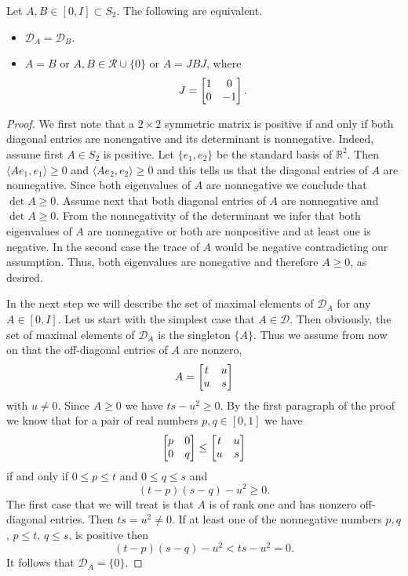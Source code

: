 \documentclass[10pt,a4paper]{amsart}
\begin{document}
\begin{lemma}\label{max}
Let $A,B \in [0,I] \subset S_2$. The following are equivalent.
\begin{itemize}
\item $\mathcal{D}_A = \mathcal{D}_B$.
\item $A= B$ or $A,B \in \mathcal{R} \cup \{ 0 \}$ or $A = JBJ$,
where
$$
J = \left[ \begin{matrix} 1& 0 \cr 0 & -1 \cr \end{matrix} \right] .
$$
\end{itemize}
\end{lemma}

\begin{proof}
We first note that a $2 \times 2$ symmetric matrix is positive if and only if both diagonal entries are nonengative and its determinant is nonnegative. Indeed, assume first $A \in S_2$ is positive. Let $\{ e_1 , e_2 \}$ be the standard basis of $\mathbb{R}^2$. Then $\langle Ae_1 , e_1 \rangle \ge 0$ and  $\langle Ae_2 , e_2 \rangle \ge 0$ and this tells us that the diagonal entries of $A$ are nonnegative. Since both eigenvalues of $A$ are nonnegative we conclude that $\det A \ge 0$. Assume next that  both diagonal entries of $A$ are nonnegative and $\det A \ge 0$. From the nonnegativity of the determinant we infer that both eigenvalues of $A$ are nonnegative or both are nonpositive and at least one is negative. In the second case the trace of $A$ would be negative contradicting our assumption. Thus, both eigenvalues are nonegative and therefore $A \ge 0$, as desired.

In the next step we will describe the set of maximal elements of $\mathcal{D}_A$ for any $A\in [0,I]$. Let us start with the simplest case that $A \in \mathcal{D}$. Then obviously, the set of maximal elements of $\mathcal{D}_A$ is the singleton $\{ A \}$. Thus we assume from now on that the off-diagonal entries of $A$ are nonzero,
$$
A = \left[ \begin{matrix} t& u \cr u & s \cr \end{matrix} \right] 
$$
with $u \not= 0$. Since $A \ge 0$ we have $ts - u^2 \ge 0$. By the first paragraph of the proof we know that for a pair of real numbers $p,q \in [0,1]$ we have
$$
\left[ \begin{matrix} p& 0 \cr 0 & q \cr \end{matrix} \right] \le \left[ \begin{matrix} t& u \cr u & s \cr \end{matrix} \right]
$$
if and only if $0 \le p \le t$ and $0 \le q \le s$ and 
\begin{equation}\label{detpos}
(t-p)(s-q) - u^2 \ge 0.
\end{equation}
The first case that we will treat is that $A$ is of rank one and has nonzero off-diagonal entries. Then $ts = u^2 \not= 0$. If at least one of the nonnegative numbers $p,q$, $p \le t$, $q \le s$, is positive then
$$
(t-p)(s-q) - u^2 < ts - u^2 = 0 .
$$
It follows that  $\mathcal{D}_A = \{ 0 \}$. 


\end{proof}
\end{document}
